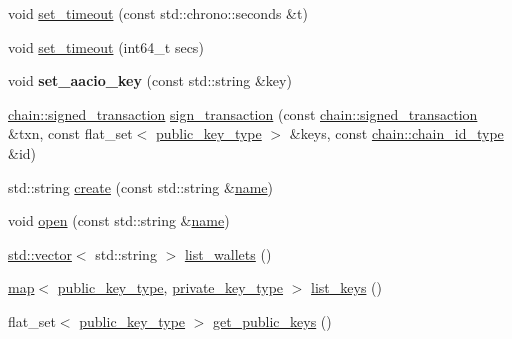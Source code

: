 \begin{DoxyCompactItemize}
void \mbox{\hyperlink{classaacio_1_1wallet_1_1wallet__manager_a0c90d0e8e821ca501a293b4aaa8fe6f2}{set\+\_\+timeout}} (const std\+::chrono\+::seconds \&t)
\item 
void \mbox{\hyperlink{classaacio_1_1wallet_1_1wallet__manager_a13796a3bd3609d3ffb6ee24fa597e403}{set\+\_\+timeout}} (int64\+\_\+t secs)
\item 
\mbox{\label{classaacio_1_1wallet_1_1wallet__manager_a0fc7c8f5fa99432d546e36ed450ac9c4}} 
void {\bfseries set\+\_\+aacio\+\_\+key} (const std\+::string \&key)
\item 
\mbox{\hyperlink{structaacio_1_1chain_1_1signed__transaction}{chain\+::signed\+\_\+transaction}} \mbox{\hyperlink{classaacio_1_1wallet_1_1wallet__manager_a0538c4f333acbee8b940d1df8a50a883}{sign\+\_\+transaction}} (const \mbox{\hyperlink{structaacio_1_1chain_1_1signed__transaction}{chain\+::signed\+\_\+transaction}} \&txn, const flat\+\_\+set$<$ \mbox{\hyperlink{classfc_1_1crypto_1_1public__key}{public\+\_\+key\+\_\+type}} $>$ \&keys, const \mbox{\hyperlink{classfc_1_1sha256}{chain\+::chain\+\_\+id\+\_\+type}} \&id)
\item 
std\+::string \mbox{\hyperlink{classaacio_1_1wallet_1_1wallet__manager_a3f00a9c85f0bbef53137253bc020e467}{create}} (const std\+::string \&\mbox{\hyperlink{structaacio_1_1name}{name}})
\item 
void \mbox{\hyperlink{classaacio_1_1wallet_1_1wallet__manager_aa0fecf0fb922ca2baeac6f2ff049d6a1}{open}} (const std\+::string \&\mbox{\hyperlink{structaacio_1_1name}{name}})
\item 
\mbox{\hyperlink{classstd_1_1vector}{std\+::vector}}$<$ std\+::string $>$ \mbox{\hyperlink{classaacio_1_1wallet_1_1wallet__manager_aeb011a9b1bce04ceb3c84c526b6f50ad}{list\+\_\+wallets}} ()
\item 
\mbox{\hyperlink{classstd_1_1map}{map}}$<$ \mbox{\hyperlink{classfc_1_1crypto_1_1public__key}{public\+\_\+key\+\_\+type}}, \mbox{\hyperlink{classfc_1_1crypto_1_1private__key}{private\+\_\+key\+\_\+type}} $>$ \mbox{\hyperlink{classaacio_1_1wallet_1_1wallet__manager_a4ab2d003046199009f52e6600f041dec}{list\+\_\+keys}} ()
\item 
flat\+\_\+set$<$ \mbox{\hyperlink{classfc_1_1crypto_1_1public__key}{public\+\_\+key\+\_\+type}} $>$ \mbox{\hyperlink{classaacio_1_1wallet_1_1wallet__manager_aeb2f671ec95e19c2da2170774c0db627}{get\+\_\+public\+\_\+keys}} ()
\item 
\mbox{\label{classaacio_1_1wallet_1_1wallet__manager_a9a428038f33268fddfd05b831fee3170}} 

\end{DoxyCompactItemize}
